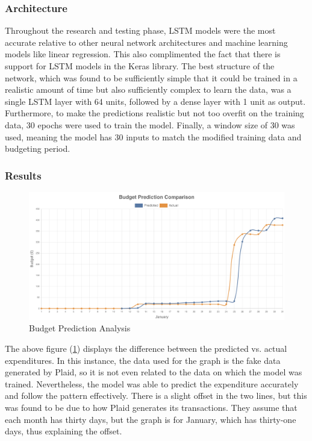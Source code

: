 \subsubsection{Architecture}
Throughout the research and testing phase, LSTM models were the most accurate relative to other neural network architectures and machine learning models like linear regression. This also complimented the fact that there is support for LSTM models in the Keras library. The best structure of the network, which was found to be sufficiently simple that it could be trained in a realistic amount of time but also sufficiently complex to learn the data, was a single LSTM layer with 64 units, followed by a dense layer with 1 unit as output. Furthermore, to make the predictions realistic but not too overfit on the training data, 30 epochs were used to train the model. Finally, a window size of 30 was used, meaning the model has 30 inputs to match the modified training data and budgeting period.

\subsubsection{Results}
\begin{figure}[H]
	\centering
	\includegraphics[width=\textwidth]{images/budget_prediction_comparison.png}
	\caption{Budget Prediction Analysis}
	\label{fig:BudgetPredictionResults}
\end{figure}

The above figure (\ref{fig:BudgetPredictionResults}) displays the difference between the predicted vs. actual expenditures. In this instance, the data used for the graph is the fake data generated by Plaid, so it is not even related to the data on which the model was trained. Nevertheless, the model was able to predict the expenditure accurately and follow the pattern effectively. There is a slight offset in the two lines, but this was found to be due to how Plaid generates its transactions. They assume that each month has thirty days, but the graph is for January, which has thirty-one days, thus explaining the offset.

